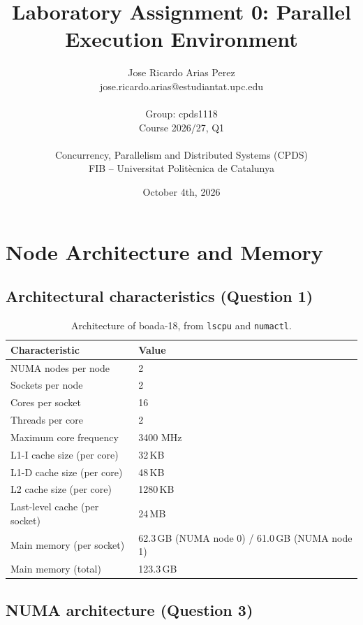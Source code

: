 \documentclass[11pt,a4paper]{article}
\title{Laboratory Assignment 0: Parallel Execution Environment}
\author{
  Jose Ricardo Arias Perez \\
  jose.ricardo.arias@estudiantat.upc.edu \\\\
  Group: cpds1118 \\
  Course 2026/27, Q1 \\\\
  Concurrency, Parallelism and Distributed Systems (CPDS) \\
  FIB -- Universitat Polit\`ecnica de Catalunya
}
\date{October 4th, 2026}
\begin{document}
\maketitle
\thispagestyle{empty}
\newpage

\section{Node Architecture and Memory}

\subsection{Architectural characteristics (Question 1)}

\begin{table}[H]
\centering
\begin{tabular}{ll}
\toprule
\textbf{Characteristic} & \textbf{Value} \\
\midrule
NUMA nodes per node           & 2 \\
Sockets per node              & 2 \\
Cores per socket              & 16 \\
Threads per core              & 2 \\
Maximum core frequency        & 3400 MHz \\
L1-I cache size (per core)    & 32\,KB \\
L1-D cache size (per core)    & 48\,KB \\
L2 cache size (per core)      & 1280\,KB \\
Last-level cache (per socket) & 24\,MB \\
Main memory (per socket)      & 62.3\,GB (NUMA node 0) / 61.0\,GB (NUMA node 1) \\
Main memory (total)           & 123.3\,GB \\
\bottomrule
\end{tabular}
\caption{Architecture of boada-18, from \texttt{lscpu} and \texttt{numactl}.}
\label{tab:arch}
\end{table}

\subsection{NUMA architecture (Question 3)}
\end{document}
